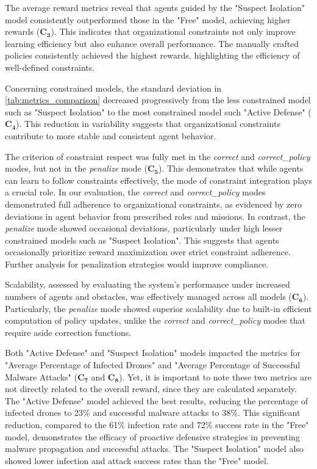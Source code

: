 The average reward metrics reveal that agents guided by the "Suspect Isolation" model consistently outperformed those in the "Free" model, achieving higher rewards ($\mathbf{C_3}$). This indicates that organizational constraints not only improve learning efficiency but also enhance overall performance. The manually crafted policies consistently achieved the highest rewards, highlighting the efficiency of well-defined constraints.

Concerning constrained models, the standard deviation in \autoref{tab:metrics_comparison} decreased progressively from the less constrained model such as "Suspect Isolation" to the most constrained model such "Active Defense" ($\mathbf{C_4}$). This reduction in variability suggests that organizational constraints contribute to more stable and consistent agent behavior.

The criterion of constraint respect was fully met in the \textit{correct} and \textit{correct\_policy} modes, but not in the \textit{penalize} mode ($\mathbf{C_5}$). This demonstrates that while agents can learn to follow constraints effectively, the mode of constraint integration plays a crucial role. In our evaluation, the \textit{correct} and \textit{correct\_policy} modes demonstrated full adherence to organizational constraints, as evidenced by zero deviations in agent behavior from prescribed roles and missions. In contrast, the \textit{penalize} mode showed occasional deviations, particularly under high lesser constrained models such as "Suspect Isolation". This suggests that agents occasionally prioritize reward maximization over strict constraint adherence. Further analysis for penalization strategies would improve compliance.

Scalability, assessed by evaluating the system's performance under increased numbers of agents and obstacles, was effectively managed across all models ($\mathbf{C_6}$). Particularly, the \textit{penalize} mode showed superior scalability due to built-in efficient computation of policy updates, unlike the \textit{correct} and \textit{correct\_policy} modes that require aside correction functions.

Both "Active Defense" and "Suspect Isolation" models impacted the metrics for "Average Percentage of Infected Drones" and "Average Percentage of Successful Malware Attacks" ($\mathbf{C_7}$ and $\mathbf{C_8}$). Yet, it is important to note these two metrics are not directly related to the overall reward, since they are calculated separately. The "Active Defense" model achieved the best results, reducing the percentage of infected drones to 23\% and successful malware attacks to 38\%. This significant reduction, compared to the 61\% infection rate and 72\% success rate in the "Free" model, demonstrates the efficacy of proactive defensive strategies in preventing malware propagation and successful attacks. The "Suspect Isolation" model also showed lower infection and attack success rates than the "Free" model.

